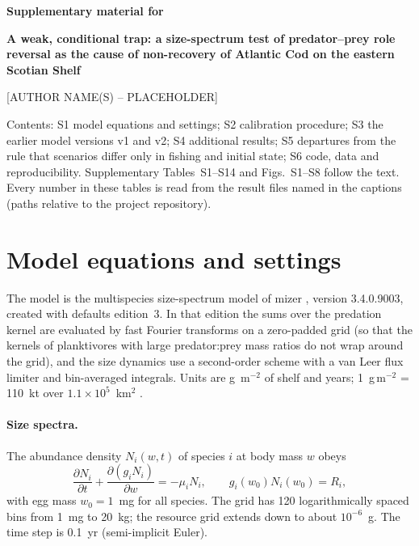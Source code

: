 \documentclass[11pt,letterpaper,fleqn]{article}
\newcommand{\gm}{g\,m$^{-2}$}
\begin{document}
\sloppy

\begin{center}
{\large\bfseries Supplementary material for}\\[0.5em]
{\Large\bfseries A weak, conditional trap: a size-spectrum test of predator--prey role reversal as the cause of non-recovery of Atlantic Cod on the eastern Scotian Shelf\par}
\vspace{1em}
[AUTHOR NAME(S) -- PLACEHOLDER]
\end{center}

\noindent Contents: S1 model equations and settings; S2 calibration procedure; S3 the earlier model versions v1 and v2; S4 additional results; S5 departures from the rule that scenarios differ only in fishing and initial state; S6 code, data and reproducibility. Supplementary Tables~S1--S14 and Figs.~S1--S8 follow the text. Every number in these tables is read from the result files named in the captions (paths relative to the project repository).

\section{Model equations and settings}\label{sec:S-eq}

The model is the multispecies size-spectrum model of mizer \autocite{scott2014mizer,delius2013mizer}, version 3.4.0.9003, created with defaults edition~3. In that edition the sums over the predation kernel are evaluated by fast Fourier transforms on a zero-padded grid (so that the kernels of planktivores with large predator:prey mass ratios do not wrap around the grid), and the size dynamics use a second-order scheme with a van Leer flux limiter and bin-averaged integrals. Units are g~m$^{-2}$ of shelf and years; 1~\gm{} = 110~kt over $1.1\times10^{5}$~km$^{2}$ \autocite{dfo2010greyseals}.

\paragraph{Size spectra.} The abundance density $N_i(w,t)$ of species $i$ at body mass $w$ obeys
\begin{equation}
\frac{\partial N_i}{\partial t}+\frac{\partial (g_i N_i)}{\partial w}=-\mu_i N_i ,\qquad g_i(w_0)N_i(w_0)=R_i ,
\end{equation}
with egg mass $w_0=1$~mg for all species. The grid has 120 logarithmically spaced bins from 1~mg to 20~kg; the resource grid extends down to about $10^{-6}$~g. The time step is 0.1~yr (semi-implicit Euler).
\end{document}
